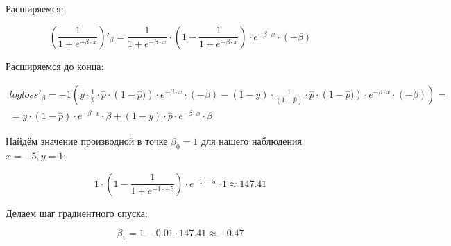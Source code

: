 \documentclass[12pt, a4paper, oneside]{article}
\begin{document}
{Расширяемся: 

$$
\left( \frac{1}{1 + e^{-\beta \cdot x}} \right)  '_{\beta}  = \frac{1}{1 + e^{-\beta \cdot x}}  \cdot  \left(1 - \frac{1}{1 + e^{-\beta \cdot x}}  \right) \cdot e^{-\beta \cdot x} \cdot (- \beta)
$$
	
Расширяемся до конца: 

\begin{multline*}
logloss'_{\beta} = -1 \left(y \cdot \frac{1}{\hat p}  \cdot  \hat p \cdot  \left(1 - \hat p)  \right) \cdot e^{-\beta \cdot x} \cdot (- \beta) - (1 - y) \cdot \frac{1}{(1 - \hat p)} \cdot  \hat p \cdot  \left(1 - \hat p)  \right) \cdot e^{-\beta \cdot x} \cdot (- \beta)  \right) = \\ =  y \cdot \left( 1 - \hat p \right) \cdot e^{-\beta \cdot x} \cdot \beta + (1 - y) \cdot  \hat p  \cdot e^{-\beta \cdot x} \cdot \beta 
\end{multline*}
	
Найдём значение производной в точке $\beta_0 = 1$ для нашего наблюдения $x = -5, y=1$: 

$$
1 \cdot \left( 1 - \frac{1}{1 + e^{-1 \cdot -5}}  \right) \cdot e^{-1 \cdot -5} \cdot 1  \approx  147.41
$$

Делаем шаг градиентного спуска: 

$$
\beta_1 = 1 - 0.01 \cdot 147.41 \approx -0.47
$$		
}
\end{document}
